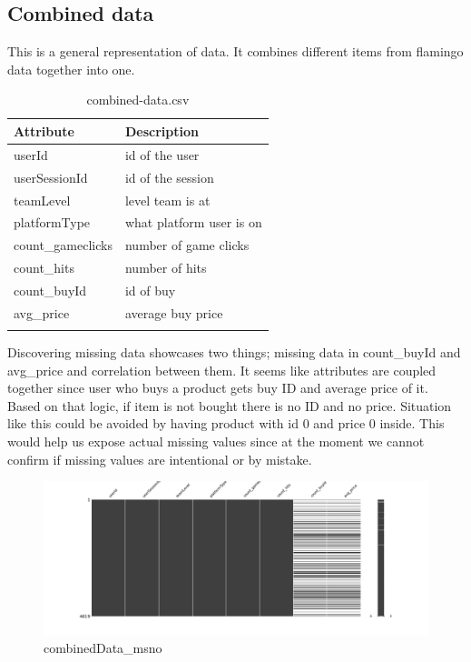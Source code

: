 \subsection{Combined data}\label{EDA}

This is a general representation of data. It combines different items from flamingo data together into one.
\begin{center}
\begin{longtable}{ |l|l| } 
 \hline
 Attribute & Description\\ 
 \hline
 userId & id of the user\\ 
 \hline
 userSessionId & id of the session\\ 
 \hline
 teamLevel & level team is at\\ 
 \hline
 platformType & what platform user is on\\ 
 \hline
 count\_gameclicks & number of game clicks\\ 
 \hline
 count\_hits & number of hits\\ 
 \hline
 count\_buyId & id of buy\\ 
 \hline
 avg\_price & average buy price\\ 
 \hline

\caption{combined-data.csv}
\end{longtable}
\end{center}

Discovering missing data showcases two things; missing data in count\_buyId and avg\_price and correlation between them. It seems like attributes are coupled together since user who buys a product gets buy ID and average price of it. Based on that logic, if item is not bought there is no ID and no price. Situation like this could be avoided by having product with id 0 and price 0 inside. This would help us expose actual missing values since at the moment we cannot confirm if missing values are intentional or by mistake.

\begin{figure}[H]
\includegraphics[scale=0.25]{img/Graphs/combinedData/missingno_combinedData.png}
\centering
\caption{combinedData\_msno}
\label{fig:combinedData_msno}
\end{figure}


